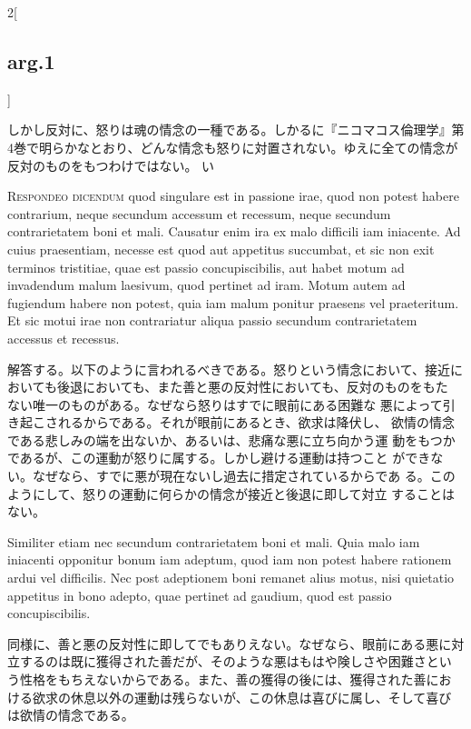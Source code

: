 \documentclass[paper=a4paper,fontsize=10pt,jafontsize=9pt,titlepage]{jlreq}
\begin{document}
\begin{paracol}{2}[\subsection{arg.1}]
\switchcolumn

しかし反対に、怒りは魂の情念の一種である。しかるに『ニコマコス倫理学』第
 4巻で明らかなとおり、どんな情念も怒りに対置されない。ゆえに全ての情念が
 反対のものをもつわけではない。
 い


{\scshape Respondeo dicendum} quod singulare est in passione irae, quod non potest
 habere contrarium, neque secundum accessum et recessum, neque secundum
 contrarietatem boni et mali. Causatur enim ira ex malo difficili iam
 iniacente. Ad cuius praesentiam, necesse est quod aut appetitus
 succumbat, et sic non exit terminos tristitiae, quae est passio
 concupiscibilis, aut habet motum ad invadendum malum laesivum, quod
 pertinet ad iram. Motum autem ad fugiendum habere non potest, quia iam
 malum ponitur praesens vel praeteritum. Et sic motui irae non
 contrariatur aliqua passio secundum contrarietatem accessus et
 recessus.

\switchcolumn

解答する。以下のように言われるべきである。怒りという情念において、接近に
 おいても後退においても、また善と悪の反対性においても、反対のものをもた
 ない唯一のものがある。なぜなら怒りはすでに眼前にある困難な
 悪によって引き起こされるからである。それが眼前にあるとき、欲求は降伏し、
 欲情の情念である悲しみの端を出ないか、あるいは、悲痛な悪に立ち向かう運
 動をもつかであるが、この運動が怒りに属する。しかし避ける運動は持つこと
 ができない。なぜなら、すでに悪が現在ないし過去に措定されているからであ
 る。このようにして、怒りの運動に何らかの情念が接近と後退に即して対立
 することはない。

\switchcolumn*

Similiter etiam nec secundum contrarietatem boni et
 mali. Quia malo iam iniacenti opponitur bonum iam adeptum, quod iam non
 potest habere rationem ardui vel difficilis. Nec post adeptionem boni
 remanet alius motus, nisi quietatio appetitus in bono adepto, quae
 pertinet ad gaudium, quod est passio concupiscibilis.

\switchcolumn

同様に、善と悪の反対性に即してでもありえない。なぜなら、眼前にある悪に対
 立するのは既に獲得された善だが、そのような悪はもはや険しさや困難さとい
 う性格をもちえないからである。また、善の獲得の後には、獲得された善にお
 ける欲求の休息以外の運動は残らないが、この休息は喜びに属し、そして喜び
 は欲情の情念である。


\end{paracol}
\end{document}
